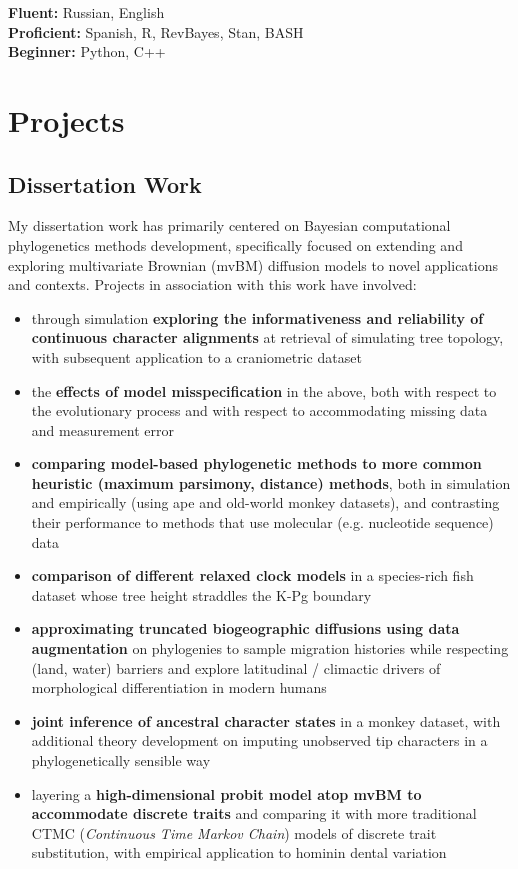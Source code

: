 \documentclass[12pt]{article}
\begin{document}
\textbf{Fluent:} Russian, English\\
\textbf{Proficient:} Spanish, R, RevBayes, Stan, BASH\\
\textbf{Beginner:} Python, C++\\

\section{Projects}

\subsection{Dissertation Work}

My dissertation work has primarily centered on Bayesian computational phylogenetics methods development, specifically focused on extending and exploring multivariate Brownian (mvBM) diffusion models to novel applications and contexts. Projects in association with this work have involved:

\begin{itemize}[noitemsep]

\item through simulation \textbf{exploring the informativeness and reliability of continuous character alignments} at retrieval of simulating tree topology, with subsequent application to a craniometric dataset 
\item the \textbf{effects of model misspecification} in the above, both with respect to the evolutionary process and with respect to accommodating missing data and measurement error
\item \textbf{comparing model-based phylogenetic methods to more common heuristic (maximum parsimony, distance) methods}, both in simulation and empirically (using ape and old-world monkey datasets), and contrasting their performance to methods that use molecular (e.g. nucleotide sequence) data
\item \textbf{comparison of different relaxed clock models} in a species-rich fish dataset whose tree height straddles the K-Pg boundary
\item \textbf{approximating truncated biogeographic diffusions using data augmentation} on phylogenies to sample migration histories while respecting (land, water) barriers and explore latitudinal / climactic drivers of morphological differentiation in modern humans 
\item \textbf{joint inference of ancestral character states} in a monkey dataset, with additional theory development on imputing unobserved tip characters in a phylogenetically sensible way 
\item layering a \textbf{high-dimensional probit model atop mvBM to accommodate discrete traits} and comparing it with more traditional CTMC (\emph{Continuous Time Markov Chain}) models of discrete trait substitution, with empirical application to hominin dental variation

\end{itemize}
\end{document}
